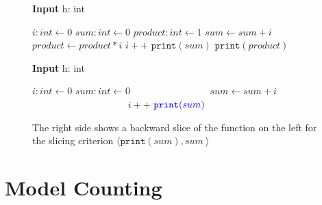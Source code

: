 \begin{figure}
    \label{fig:slice}
    \centering
    \begin{minipage}{.4\textwidth}
        \begin{algorithm}[H]
            \hspace*{\algorithmicindent} \textbf{Input} h: int \\
            \hspace*{1em}
            \begin{algorithmic}
                \State $i: int \leftarrow 0$
                \State $sum: int \leftarrow 0$
                \State $product: int \leftarrow 1$
                    \State $sum \leftarrow sum + i$
                    \State $product \leftarrow product * i$
                    \State $i++$
                \EndWhile
                \State $\mathtt{print}(sum)$
                \State $\mathtt{print}(product)$
            \end{algorithmic}
        \end{algorithm}
    \end{minipage}
    \hfill
    \begin{minipage}{.4\textwidth}
        \begin{algorithm}[H]
            \hspace*{\algorithmicindent} \textbf{Input} h: int \\
            \hspace*{1em}
            \begin{algorithmic}
                \State $i: int \leftarrow 0$
                \State $sum: int \leftarrow 0$
                \State $\color{white} product: int \leftarrow 1$
                    \State $sum \leftarrow sum + i$
                    \State $\color{white} product \leftarrow product * i$
                    \State $i++$
                \EndWhile
                \State $\color{blue} \mathtt{print}(sum)$
                \State $\color{white} \mathtt{print}(product)$
            \end{algorithmic}
        \end{algorithm}
    \end{minipage}
    \caption{The right side shows a backward slice of the function on the left for the slicing criterion $\langle \mathtt{print}(sum), sum \: \rangle$}
\end{figure}

\section{Model Counting}

